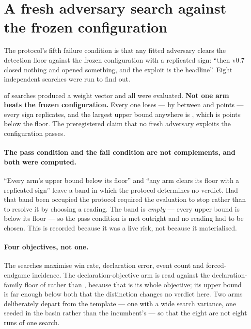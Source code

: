 \section{A fresh adversary search against the frozen configuration}
\label{sec:exploit}

The protocol's fifth failure condition is that any fitted adversary clears the detection floor against
the frozen configuration with a replicated sign: ``then v0.7 closed nothing and opened something, and
the exploit is the headline''. Eight independent searches were run to find out.

\begin{table}[t]\centering
\caption{Eight independent adversary searches against \frozen{}. A positive edge would mean the
adversary beats the target; every one is negative. Each arm was fitted on a stream disjoint from the
banks it is evaluated on.}
\label{tab:adversaries}
{\small}
\end{table}

\vsevenBfourFits{} of \vsevenBfourArms{} searches produced a weight vector and all
\vsevenBfourArms{} were evaluated. \textbf{Not one arm beats the frozen configuration.} Every one
loses --- by between \vsevenBfourBestLoss{} and \vsevenBfourWorstLoss{} points --- every sign
replicates, and the largest upper bound anywhere is \vsevenBfourWorstUpper{}, which is
\vsevenBfourFloorGap{} points below the floor. The preregistered claim that no fresh adversary
exploits the configuration passes.

\paragraph{The pass condition and the fail condition are not complements, and both were computed.}
``Every arm's upper bound below its floor'' and ``any arm clears its floor with a replicated sign''
leave a band in which the protocol determines no verdict. Had that band been occupied the protocol
required the evaluation to stop rather than to resolve it by choosing a reading. The band is
\emph{empty} --- every upper bound is below its floor --- so the pass condition is met outright and no
reading had to be chosen. This is recorded because it was a live risk, not because it materialised.

\paragraph{Four objectives, not one.} The searches maximise win rate, declaration error, event count
and forced-endgame incidence. The declaration-objective arm is read against the declaration-family
floor of \vsevenDeclFloor{} rather than \vsevenPrimaryFloor{}, because that is its whole objective; its
upper bound is far enough below both that the distinction changes no verdict here. Two arms
deliberately depart from the template --- one with a wide search variance, one seeded in the \vfive{}
basin rather than the incumbent's --- so that the eight are not eight runs of one search.


